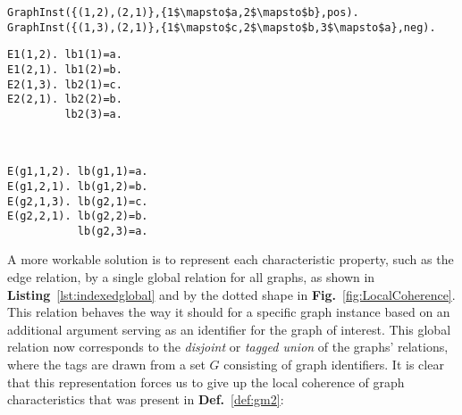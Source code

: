 \begin{lstlisting}[mathescape,caption=Higher order predicate modeling the set $\graphset{G}$ of Def~\ref{def:gm2}.,label=lst:HOPred]
GraphInst({(1,2),(2,1)},{1$\mapsto$a,2$\mapsto$b},pos).
GraphInst({(1,3),(2,1)},{1$\mapsto$c,2$\mapsto$b,3$\mapsto$a},neg).
\end{lstlisting}
\begin{minipage}[t]{0.45\linewidth}
\begin{lstlisting}[mathescape,caption=Multiple individual global relations,label=lst:multiglobal]
E1(1,2). lb1(1)=a.
E1(2,1). lb1(2)=b.
E2(1,3). lb2(1)=c.
E2(2,1). lb2(2)=b.
         lb2(3)=a.
\end{lstlisting}
\end{minipage}
\begin{minipage}[t]{0.1\linewidth}
 ~
\end{minipage}
\begin{minipage}[t]{0.45\linewidth}
\begin{lstlisting}[mathescape,caption=Disjoint union using indexed global relations,label=lst:indexedglobal]
E(g1,1,2). lb(g1,1)=a.
E(g1,2,1). lb(g1,2)=b.
E(g2,1,3). lb(g2,1)=c.
E(g2,2,1). lb(g2,2)=b.
           lb(g2,3)=a.
\end{lstlisting}
\end{minipage}




A more workable solution is to represent each characteristic property, such as the edge relation, by a single global relation for all graphs, as shown in \textbf{Listing}~\ref{lst:indexedglobal} and by the dotted shape in \textbf{Fig.}~\ref{fig:LocalCoherence}.
This relation behaves the way it should for a specific graph instance based on an additional argument serving as an identifier for the graph of interest.
This global relation now corresponds to the \emph{disjoint} or \emph{tagged union} of the graphs' relations, where the tags are drawn from a set $G$ consisting of graph identifiers.
It is clear that this representation forces us to give up the local coherence of graph characteristics that was present in \textbf{Def.}~\ref{def:gm2}: 

